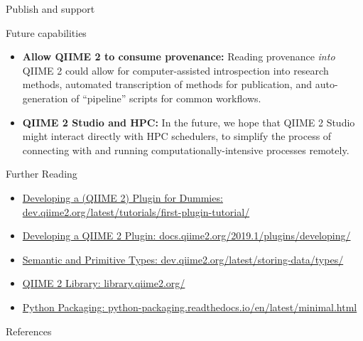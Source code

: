 \documentclass[final]{beamer}
\newlength{\colwidth}
\begin{document}
\begin{frame}[t]
\begin{columns}[t]
\begin{column}{\colwidth}
\begin{block}{Publish and support}
  \end{block}

  \begin{block}{Future capabilities}

    \begin{itemize}
      \item \textbf{Allow QIIME 2 to consume provenance:} Reading
      provenance \textit{into} QIIME 2 could allow for computer-assisted
      introspection into research methods, automated transcription of methods
      for publication, and auto-generation of “pipeline” scripts for common workflows.
      \item \textbf{QIIME 2 Studio and HPC:} In the future, we hope that QIIME 2 Studio might interact
      directly with HPC schedulers, to simplify the process of connecting with
      and running computationally-intensive processes remotely.
    \end{itemize}

  \end{block}

  \begin{block}{Further Reading}
    \begin{itemize}
      \item \href{https://dev.qiime2.org/latest/tutorials/first-plugin-tutorial/}{Developing a (QIIME 2) Plugin for Dummies: dev.qiime2.org/latest/tutorials/first-plugin-tutorial/}
      \item \href{https://docs.qiime2.org/2019.1/plugins/developing/}{Developing a QIIME 2 Plugin: docs.qiime2.org/2019.1/plugins/developing/}
      \item \href{https://dev.qiime2.org/latest/storing-data/types/}{Semantic and Primitive Types: dev.qiime2.org/latest/storing-data/types/}
      \item \href{https://library.qiime2.org/}{QIIME 2 Library: library.qiime2.org/}
      \item \href{https://python-packaging.readthedocs.io/en/latest/minimal.html}{Python Packaging: python-packaging.readthedocs.io/en/latest/minimal.html}
    \end{itemize}
  \end{block}

  \begin{block}{References}
    \nocite{*}
    
  \end{block}


\end{column}
\end{columns}
\end{frame}
\end{document}
